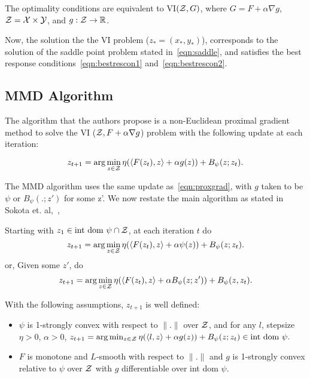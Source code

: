 The optimality conditions are equivalent to VI$(\mathcal{Z}, G)$, where $G = F + \alpha \nabla g$, $\mathcal{Z}
	= \mathcal{X} \times \mathcal{Y}$, and $g: \mathcal{Z} \rightarrow \mathbb{R}$.

Now, the solution the the VI problem ($z_{\ast}= (x_{\ast}, y_{\ast})$), corresponds to the
solution of the saddle point problem stated in~\ref{eqn:saddle}, and satisfies the best response
conditions~\ref{eqn:bestrescon1} and~\ref{eqn:bestrescon2}.

\subsection{MMD Algorithm}

The algorithm that the authors propose is a non-Euclidean proximal gradient method to solve the VI
($\mathcal{Z}, F + \alpha \nabla g$) problem with the following update at each iteration:

\begin{equation}
	\label{eqn:proxgrad} z_{t+1} = \arg \min_{z \in \mathcal{Z}} \eta
	(\langle F(z_t), z\rangle + \alpha g(z)) + B_{\psi} (z; z_t).
\end{equation}

The MMD algorithm uses the same update as~\ref{eqn:proxgrad}, with $g$ taken to be $\psi$ or
$B_{\psi}(.
	;z')$
for some z'.
We now restate the main algorithm as stated in Sokota et.
al,~\cite{sokotaUnified2023},

\begin{alprocedure}
	\label{alg:mmd}
	Starting with $z_1 \in \text{int dom } \psi \cap \mathcal{Z}$, at each iteration $t$ do $$ z_{t+1} = \arg
		\min_{z \in \mathcal{Z}} \eta (\langle F(z_t), z\rangle + \alpha \psi(z)) + B_{\psi} (z; z_t).
	$$
	or,
	Given some $z'$, do $$ z_{t+1} = \arg \min_{z \in \mathcal{Z}} \eta (\langle F(z_t), z\rangle + \alpha
		B_{\psi}(z; z')) + B_{\psi} (z, z_t).
	$$
\end{alprocedure}

With the following assumptions, $z_{t+1}$ is well defined:

\begin{itemize}
	\item $\psi$ is 1-strongly convex with respect to $\|.
		      \|$ over $\mathcal{Z}$, and for
	      any $l$, stepsize $\eta > 0$, $\alpha > 0$,
	      $z_{t+1} = \arg \min_{z \in \mathcal{Z}} \eta (\langle l, z \rangle + \alpha g(z)) + B_{\psi}(z;z_t) \in \text{int dom } \psi.$

	\item $F$ is monotone and $L$-smooth with respect to $\|.\|$ and $g$ is 1-strongly convex
	      relative to $\psi$ over $\mathcal{Z}$ with $g$ differentiable over int dom $\psi$.
\end{itemize}


